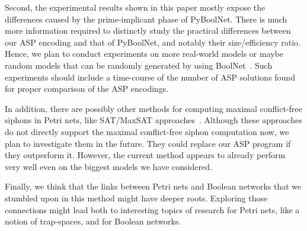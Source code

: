 \documentclass[preprint,12pt]{elsarticle}
\begin{document}
Second, the experimental results shown in this paper mostly expose the differences caused by the prime-implicant phase of PyBoolNet. There is much more information required to distinctly study the practical differences between our ASP encoding and that of PyBoolNet, and notably their size/efficiency ratio.
Hence, we plan to conduct experiments on more real-world models or maybe random models that can be randomly generated by using BoolNet~\cite{mussel2010boolnet}.
Such experiments should include a time-course of the number of ASP solutions found for proper comparison of the ASP encodings.

In addition, there are possibly other methods for computing maximal conflict-free siphons in Petri nets, like SAT/MaxSAT approaches~\cite{nabli2016enumerating}. Although these approaches do not directly support the maximal conflict-free siphon computation now, we plan to investigate them in the future. They could replace our ASP program if they outperform it.
However, the current method appears to already perform very well even on the biggest models we have considered.

Finally, we think that the links between Petri nets and Boolean networks that we stumbled upon in this method might have deeper roots. Exploring those connections might lead both to interesting topics of research for Petri nets, like a notion of trap-spaces, and for Boolean networks.




 






\end{document}
